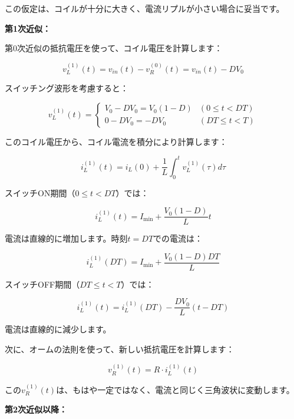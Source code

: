 この仮定は、コイルが十分に大きく、電流リプルが小さい場合に妥当です。

\textbf{第1次近似：}

第0次近似の抵抗電圧を使って、コイル電圧を計算します：

\begin{equation}
v_L^{(1)}(t) = v_{in}(t) - v_R^{(0)}(t) = v_{in}(t) - DV_0
\end{equation}

スイッチング波形を考慮すると：

\begin{equation}
v_L^{(1)}(t) = \begin{cases}
V_0 - DV_0 = V_0(1-D) & (0 \leq t < DT) \\
0 - DV_0 = -DV_0 & (DT \leq t < T)
\end{cases}
\end{equation}

このコイル電圧から、コイル電流を積分により計算します：

\begin{equation}
i_L^{(1)}(t) = i_L(0) + \frac{1}{L} \int_0^t v_L^{(1)}(\tau) d\tau
\end{equation}

スイッチON期間（$0 \leq t < DT$）では：

\begin{equation}
i_L^{(1)}(t) = I_{\min} + \frac{V_0(1-D)}{L} t
\end{equation}

電流は直線的に増加します。時刻$t = DT$での電流は：

\begin{equation}
i_L^{(1)}(DT) = I_{\min} + \frac{V_0(1-D)DT}{L}
\end{equation}

スイッチOFF期間（$DT \leq t < T$）では：

\begin{equation}
i_L^{(1)}(t) = i_L^{(1)}(DT) - \frac{DV_0}{L}(t - DT)
\end{equation}

電流は直線的に減少します。

次に、オームの法則を使って、新しい抵抗電圧を計算します：

\begin{equation}
v_R^{(1)}(t) = R \cdot i_L^{(1)}(t)
\end{equation}

この$v_R^{(1)}(t)$は、もはや一定ではなく、電流と同じく三角波状に変動します。

\textbf{第2次近似以降：}

